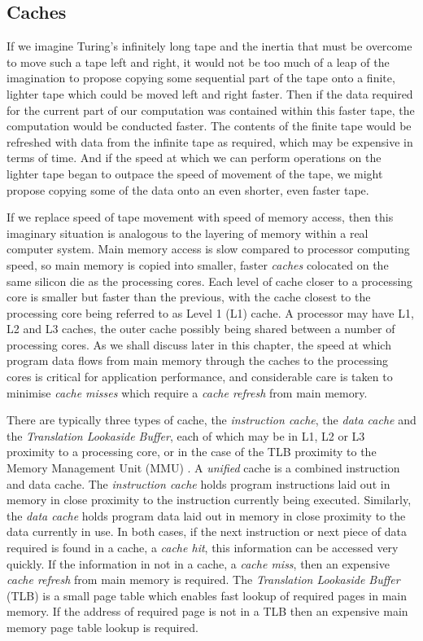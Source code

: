   
\subsection{Caches}

If we imagine Turing's infinitely long tape and the inertia that must be overcome to move such a tape left and right, it would not be too much of a leap of the imagination to propose copying some sequential part of the tape onto a finite, lighter tape which could be moved left and right faster. Then if the data required for the current part of our computation was contained within this faster tape, the computation would be conducted faster. The contents of the finite tape would be refreshed with data from the infinite tape as required, which may be expensive in terms of time. And if the speed at which we can perform operations on the lighter tape began to outpace the speed of movement of the tape, we might propose copying some of the data onto an even shorter, even faster tape.

If we replace speed of tape movement with speed of memory access, then this imaginary situation is analogous to the layering of memory within a real computer system. Main memory access is slow compared to processor computing speed, so main memory is copied into smaller, faster \emph{caches} colocated on the same silicon die as the processing cores. Each level of cache closer to a processing core is smaller but faster than the previous, with the cache closest to the processing core being referred to as Level 1 (L1) cache. A processor may have L1, L2 and L3 caches, the outer cache possibly being shared between a number of processing cores. As we shall discuss later in this chapter, the speed at which program data flows from main memory through the caches to the processing cores is critical for application performance, and considerable care is taken to minimise \emph{cache misses} which require a \emph{cache refresh} from main memory.

There are typically three types of cache, the \emph{instruction cache}, the \emph{data cache} and the \emph{Translation Lookaside Buffer}, each of which may be in L1, L2 or L3 proximity to a processing core, or in the case of the TLB proximity to the Memory Management Unit (MMU) . A \emph{unified} cache is a combined instruction and data cache. The \emph{instruction cache} holds program instructions laid out in memory in close proximity to the instruction currently being executed. Similarly, the \emph{data cache} holds program data laid out in memory in close proximity to the data currently in use. In both cases, if the next instruction or next piece of data required is found in a cache, a \emph{cache hit}, this information can be accessed very quickly. If the information in not in a cache, a \emph{cache miss}, then an expensive \emph{cache refresh} from main memory is required. The \emph{Translation Lookaside Buffer} (TLB) is a small page table which enables fast lookup of required pages in main memory. If the address of required page is not in a TLB then an expensive main memory page table lookup is required.   

